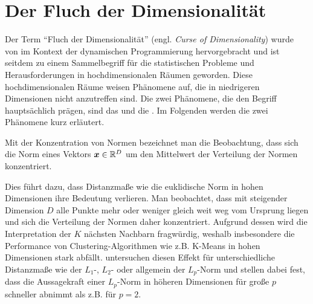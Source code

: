 \section{Der Fluch der Dimensionalität}
\label{ch:Dimensionsreduktion:FluchDerDim}

Der Term \enquote{Fluch der Dimensionalität} (engl. \textit{Curse of Dimensionality}) wurde von
\textcite{Bellman.1957} im Kontext der dynamischen Programmierung hervorgebracht und ist seitdem zu
einem Sammelbegriff für die statistischen Probleme und Herausforderungen in hochdimensionalen
Räumen geworden. Diese hochdimensionalen Räume weisen Phänomene auf, die in niedrigeren Dimensionen
nicht anzutreffen sind. Die zwei Phänomene, die den Begriff hauptsächlich prägen, sind das
 und die  \parencite[6 -- 9]{Lee.2007}. Im Folgenden werden die zwei Phänomene kurz erläutert.

Mit der Konzentration von Normen bezeichnet man die Beobachtung, dass sich die Norm eines Vektors
$\bm{x} \in \mathbb{R}^D$ um den Mittelwert der Verteilung der Normen konzentriert.


Dies führt dazu, dass Distanzmaße wie die euklidische Norm in hohen Dimensionen ihre Bedeutung
verlieren. Man beobachtet, dass mit steigender Dimension $D$ alle Punkte mehr oder weniger gleich
weit weg vom Ursprung liegen und sich die Verteilung der Normen daher konzentriert. Aufgrund dessen
wird die Interpretation der $K$ nächsten Nachbarn fragwürdig, weshalb insbesondere die Performance
von Clustering-Algorithmen wie z.B. K-Means in hohen Dimensionen stark abfällt.
\textcite{Aggarwal.2001} untersuchen diesen Effekt für unterschiedliche Distanzmaße wie der $L_1$-,
$L_2$- oder allgemein der $L_p$-Norm und stellen dabei fest, dass die Aussagekraft einer $L_p$-Norm
in höheren Dimensionen für große $p$ schneller abnimmt als z.B. für $p = 2$.

